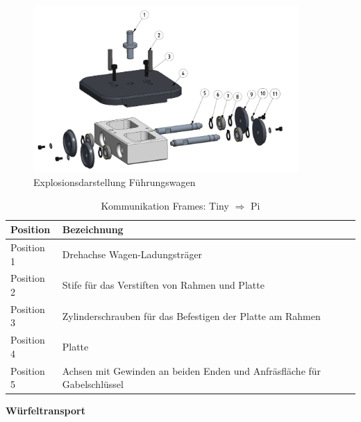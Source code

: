 \documentclass[../../main.tex]{subfiles}
\begin{document}
    \begin{figure}[H] %
        \centering
        \includegraphics[width=0.9\textwidth]{Fuehrungswagen.png}
        \caption{Explosionsdarstellung Führungswagen}
        \label{fig:expl_fuehrungswagen}
    \end{figure}

    \begin{table}[H] \centering
        \begin{tabular}{|l|l|}
        \hline
        \textbf{Position} & \textbf{Bezeichnung}\\
        \hline
        Position 1          & Drehachse Wagen-Ladungsträger\\
         \hline
        Position 2          & Stife für das Verstiften von Rahmen und Platte\\
        \hline
        Position 3          & Zylinderschrauben für das Befestigen der Platte am Rahmen\\
        \hline
        Position 4          & Platte\\
        \hline
        Position 5          & Achsen mit Gewinden an beiden Enden und Anfräsfläche für Gabelschlüssel\\
        \hline
        \end{tabular}
        
        \caption{Kommunikation Frames: Tiny $\Rightarrow$ Pi}
        \label{tab:com_tiny_pi}
        \end{table}

    \textbf{Würfeltransport}\\
\end{document}
